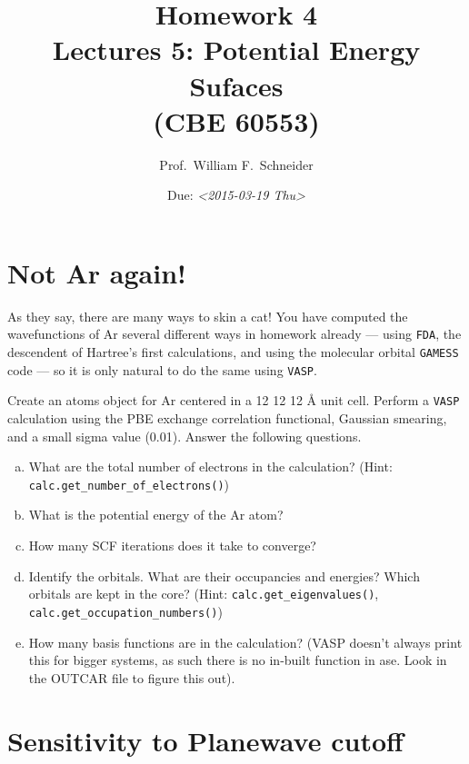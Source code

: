 \documentclass[11pt]{article}
\date{Due: \textit{<2015-03-19 Thu>}}
\title{}
\begin{document}
\title{Homework 4\\Lectures 5: Potential Energy Sufaces\\(CBE 60553)}
\author{Prof.\ William F.\ Schneider}
\maketitle

\section{Not Ar again! \label{sec:Ar}}
\label{sec-1}

As they say, there are many ways to skin a cat! You have computed the wavefunctions of Ar several different ways in homework already — using \texttt{FDA}, the descendent of Hartree’s first calculations, and using the molecular orbital \texttt{GAMESS} code — so it is only natural to do the same using \texttt{VASP}. 

Create an atoms object for Ar centered in a 12 \texttimes{} 12 \texttimes{} 12 \AA{} unit cell. Perform a \texttt{VASP} calculation using the PBE exchange correlation functional, Gaussian smearing, and a small sigma value (0.01). Answer the following questions.

\begin{enumerate}[(a)]
\item What are the total number of electrons in the calculation? (Hint: \verb~calc.get_number_of_electrons()~)

\item What is the potential energy of the Ar atom?

\item How many SCF iterations does it take to converge?

\item Identify the orbitals. What are their occupancies and energies? Which orbitals are kept in the core? (Hint: \verb~calc.get_eigenvalues()~, \verb~calc.get_occupation_numbers()~)

\item How many basis functions are in the calculation? (VASP doesn't always print this for bigger systems, as such there is no in-built function in ase. Look in the OUTCAR file to figure this out).
\end{enumerate}


\section{Sensitivity to Planewave cutoff}
\label{sec-2}
\end{document}
